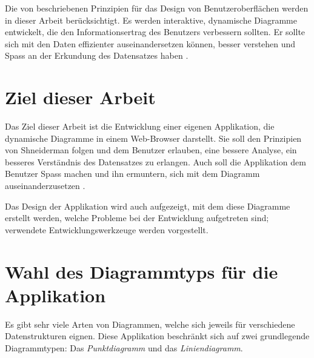 Die von \citeauthor{shneiderman} beschriebenen Prinzipien für das Design von Benutzeroberflächen werden in dieser Arbeit berücksichtigt. Es werden interaktive, dynamische Diagramme entwickelt, die den Informationsertrag des Benutzers verbessern sollten. Er sollte sich mit den Daten effizienter auseinandersetzen können, besser verstehen und Spass an der Erkundung des Datensatzes haben \cite[Kapitel 1]{shneiderman}.

\section{Ziel dieser Arbeit}

Das Ziel dieser Arbeit ist die Entwicklung einer eigenen Applikation, die dynamische Diagramme in einem Web-Browser darstellt. Sie soll den Prinzipien von Shneiderman folgen und dem Benutzer erlauben, eine bessere Analyse, ein besseres Verständnis des Datensatzes zu erlangen. Auch soll die Applikation dem Benutzer Spass machen und ihn ermuntern, sich mit dem Diagramm auseinanderzusetzen \cite[Kapitel 1]{shneiderman}.

Das Design der Applikation wird auch aufgezeigt, mit dem diese Diagramme erstellt werden, welche Probleme bei der Entwicklung aufgetreten sind; verwendete Entwicklungswerkzeuge werden vorgestellt.

\section{Wahl des Diagrammtyps für die Applikation}

Es gibt sehr viele Arten von Diagrammen, welche sich jeweils für verschiedene Datenstrukturen eignen. 
Diese Applikation beschränkt sich auf zwei grundlegende Diagrammtypen: Das \textit{Punktdiagramm} und das \textit{Liniendiagramm}.

